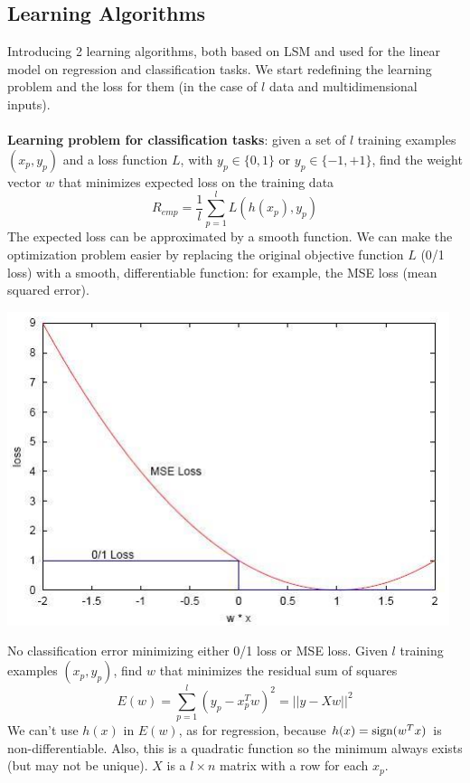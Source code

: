 \documentclass[10pt]{report}
\begin{document}
\subsection{Learning Algorithms} Introducing 2 learning algorithms, both based on LSM and used for the linear model on regression and classification tasks. We start redefining the learning problem and the loss for them (in the case of $l$ data and multidimensional inputs).\\\\
\textbf{Learning problem for classification tasks}: given a set of $l$ training examples $(x_p, y_p)$ and a loss function $L$, with $y_p \in \{0,1\}$ or $y_p \in \{-1, +1\}$, find the weight vector $w$ that minimizes expected loss on the training data $$R_{emp} = \frac{1}{l}\sum_{p=1}^l L(h(x_p), y_p)$$
The expected loss can be approximated by a smooth function. We can make the optimization problem easier by replacing the original objective function $L$ (0/1 loss) with a smooth, differentiable function: for example, the MSE loss (mean squared error).
\begin{center}
	\includegraphics[scale=0.75]{4.png}
\end{center}
No classification error minimizing either 0/1 loss or MSE loss. Given $l$ training examples $(x_p, y_p)$, find $w$ that minimizes the residual sum of squares $$E(w)= \sum_{p=1}^l (y_p - x_p^T w)^2 = ||y - Xw||^2$$
We can't use $h(x)$ in $E(w)$, as for regression, because $h(x) = \hbox{sign}(w^T x)$ is non-differentiable. Also, this is a quadratic function so the minimum always exists (but may not be unique). $X$ is a $l\times n$ matrix with a row for each $x_p$.
\end{document}
